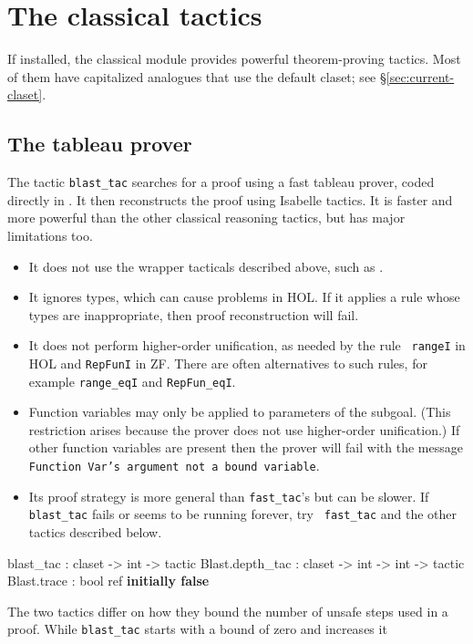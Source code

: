 \section{The classical tactics}
 If installed, the classical module provides
powerful theorem-proving tactics.  Most of them have capitalized analogues
that use the default claset; see {\S}\ref{sec:current-claset}.


\subsection{The tableau prover}
The tactic \texttt{blast_tac} searches for a proof using a fast tableau prover,
coded directly in \ML.  It then reconstructs the proof using Isabelle
tactics.  It is faster and more powerful than the other classical
reasoning tactics, but has major limitations too.
\begin{itemize}
\item It does not use the wrapper tacticals described above, such as
  .
\item It ignores types, which can cause problems in HOL.  If it applies a rule
  whose types are inappropriate, then proof reconstruction will fail.
\item It does not perform higher-order unification, as needed by the rule {\tt
    rangeI} in HOL and \texttt{RepFunI} in ZF.  There are often alternatives
  to such rules, for example {\tt range_eqI} and \texttt{RepFun_eqI}.
\item Function variables may only be applied to parameters of the subgoal.
(This restriction arises because the prover does not use higher-order
unification.)  If other function variables are present then the prover will
fail with the message {\small\tt Function Var's argument not a bound variable}.
\item Its proof strategy is more general than \texttt{fast_tac}'s but can be
  slower.  If \texttt{blast_tac} fails or seems to be running forever, try {\tt
  fast_tac} and the other tactics described below.
\end{itemize}
%
\begin{ttbox} 
blast_tac        : claset -> int -> tactic
Blast.depth_tac  : claset -> int -> int -> tactic
Blast.trace      : bool ref \hfill{\bf initially false}
\end{ttbox}
The two tactics differ on how they bound the number of unsafe steps used in a
proof.  While \texttt{blast_tac} starts with a bound of zero and increases it
